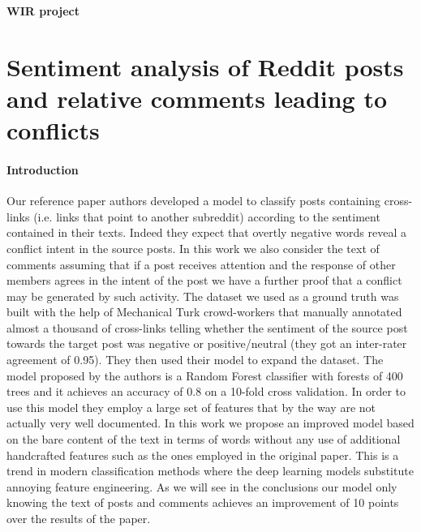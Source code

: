\documentclass[a4paper, 9pt]{article}
\begin{document}
\noindent
\large\textbf{WIR project}

\section*{Sentiment analysis of Reddit posts and relative comments leading to conflicts}

\paragraph*{Introduction}
Our reference paper authors developed a model to classify posts containing cross-links (i.e. links that
point to another subreddit) according to the sentiment contained in their texts. Indeed they expect that 
overtly negative words reveal a conflict intent in the source posts. In this work we also consider the text
of comments assuming that if a post receives attention and the response of other members agrees in the 
intent of the post we have a further proof that a conflict may be generated by such activity.
The dataset we used as a ground truth was built with the help of Mechanical Turk crowd-workers that manually
annotated almost a thousand of cross-links telling whether the sentiment of the source post towards the
target post was negative or positive/neutral (they got an inter-rater agreement of 0.95). They then used
their model to expand the dataset. The model proposed by the authors is a Random Forest classifier with
forests of 400 trees and it achieves an accuracy of 0.8 on a 10-fold cross validation. In order to use this
model they employ a large set of features that by the way are not actually very well documented.
In this work we propose an improved model based on the bare content of the text in terms of words without 
any use of additional handcrafted features such as the ones employed in the original paper. This is a trend
in modern classification methods where the deep learning models substitute annoying feature engineering.
As we will see in the conclusions our model only knowing the text of posts and comments achieves an
improvement of 10 points over the results of the paper.
\end{document}
